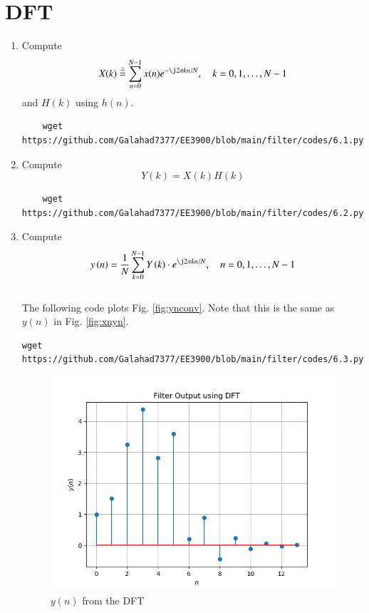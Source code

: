 \documentclass[journal,12pt,twocolumn]{IEEEtran}
\renewcommand\thesection{\arabic{section}}
\begin{document}
%
\section{DFT }
\begin{enumerate}[label=\thesection.\arabic*]
\item
Compute
\begin{equation}
X(k) \define \sum _{n=0}^{N-1}x(n) e^{-\j2\pi kn/N}, \quad k = 0,1,\dots, N-1
\end{equation}
and $H(k)$ using $h(n)$.

\solution
\begin{lstlisting}
    wget https://github.com/Galahad7377/EE3900/blob/main/filter/codes/6.1.py
\end{lstlisting}
\item Compute 
\begin{equation}
Y(k) = X(k)H(k)
\end{equation}

\solution
\begin{lstlisting}
    wget https://github.com/Galahad7377/EE3900/blob/main/filter/codes/6.2.py
\end{lstlisting}
\item Compute
\begin{equation}
 y\brak{n}={\frac {1}{N}}\sum _{k=0}^{N-1}Y\brak{k}\cdot e^{\j 2\pi kn/N},\quad n = 0,1,\dots, N-1
\end{equation}
\\
\solution The following code plots Fig. \ref{fig:ynconv}. Note that this is the same as 
$y(n)$ in  Fig. 
\ref{fig:xnyn}. 
%
\begin{lstlisting}
wget https://github.com/Galahad7377/EE3900/blob/main/filter/codes/6.3.py
\end{lstlisting}
\begin{figure}[!ht]
\centering
\includegraphics[width=\columnwidth]{./figs/6.3.png}
\caption{$y(n)$ from the DFT}
\label{fig:yndft}
\end{figure}


\end{enumerate}
\end{document}
